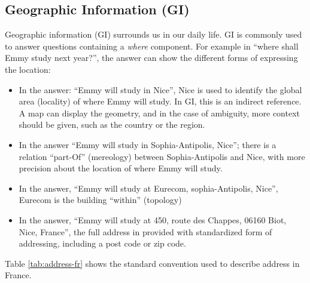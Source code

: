 \subsection{Geographic Information (GI)}
\label{sec:geoinfo}
Geographic information (GI) surrounds us in our daily life. GI is commonly used to answer questions containing a \textit{where} component. For example in ``where shall Emmy study next year?'', the answer can show the different forms of expressing the location:
\begin{itemize}
 \item In the answer: ``Emmy will study in Nice'', Nice is used to identify the global area (locality) of where Emmy will study. In GI, this is an indirect reference. A map can display the geometry, and in the case of ambiguity, more context should be given, such as the country or the region.
 \item In the answer ``Emmy will study in Sophia-Antipolis, Nice''; there is a relation ``part-Of'' (mereology) between Sophia-Antipolis and Nice, with more precision about the location of where Emmy will study.
 \item In the answer, ``Emmy will study at Eurecom, sophia-Antipolis, Nice'', Eurecom is the building ``within'' (topology)
 \item In the answer, ``Emmy will study at 450, route des Chappes, 06160 Biot, Nice, France'', the full address in provided with  standardized form of addressing, including a post code or zip code.
\end{itemize}

Table \ref{tab:address-fr} shows the standard convention used to describe address in France.
\begin{table}[!htbp]
\end{table}


